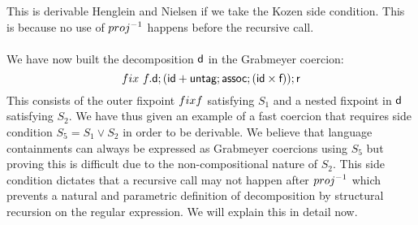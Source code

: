 \documentclass[a4paper,UKenglish,cleveref, autoref, thm-restate]{lipics-v2021}
\begin{document}
This is derivable Henglein and Nielsen if we take the Kozen side condition. This is because no use of $\dslcominv{proj}$ happens before the recursive call.\\\\
We have now built the decomposition $\textsf{d}$ in the Grabmeyer coercion:
\[ \fix~f. \dslcom{d}; (\dslcom{id} + \dslcom{untag} ; \dslcom{assoc} ; (\dslcom{id} \times \dslcom{f})) ;\dslcom{r} \]
This consists of the outer fixpoint $\fix f$ satisfying $S_1$ and a nested fixpoint in $\textsf{d}$ satisfying $S_2$. We have thus given an example of a fast coercion that requires side condition $S_5 = S_1 \lor S_2$ in order to be derivable. We believe that language containments can always be expressed as Grabmeyer coercions using $S_5$ but proving this is difficult due to the non-compositional nature of $S_2$. This side condition dictates that a recursive call may not happen after $\dslcominv{proj}$ which prevents a natural and parametric definition of decomposition by structural recursion on the regular expression. We will explain this in detail now.
\end{document}
